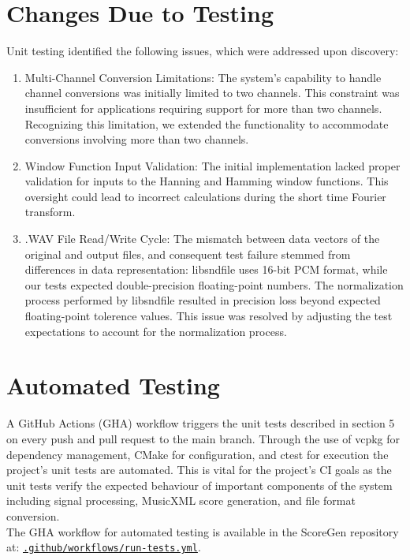\documentclass[12pt, titlepage]{article}
\begin{document}
\section{Changes Due to Testing}
Unit testing identified the following issues, which were addressed upon discovery:
\begin{enumerate}
  \item Multi-Channel Conversion Limitations: The system's capability to handle channel conversions was 
  initially limited to two channels. This constraint was insufficient for applications requiring support 
  for more than two channels. Recognizing this limitation, we extended the functionality to accommodate 
  conversions involving more than two channels.
  \item Window Function Input Validation: The initial implementation lacked proper validation for inputs 
  to the Hanning and Hamming window functions. This oversight could lead to incorrect calculations during 
  the short time Fourier transform.
  \item .WAV File Read/Write Cycle: The mismatch between data vectors of the original and output files, and consequent 
  test failure stemmed from differences in data representation: libsndfile uses 16-bit PCM format, while our tests expected 
  double-precision floating-point numbers. The normalization process performed by libsndfile resulted in precision loss beyond
  expected floating-point tolerence values. This issue was resolved by adjusting the test expectations to account for the
  normalization process.
\end{enumerate}



\section{Automated Testing}
A GitHub Actions (GHA) workflow triggers the unit tests described in section 5 on every push and pull request to the main branch. 
Through the use of vcpkg for dependency management, CMake for configuration, and ctest for execution the project's unit tests are 
automated. This is vital for the project's CI goals as the unit tests verify the expected behaviour of important components of the 
system including signal processing, MusicXML score generation, and file format conversion. \\
The GHA workflow for automated testing is available in the ScoreGen repository at: 
\href{https://github.com/emilyperica/ScoreGen/blob/main/.github/workflows/run-tests.yml}{\texttt{.github/workflows/run-tests.yml}}.
\end{document}
